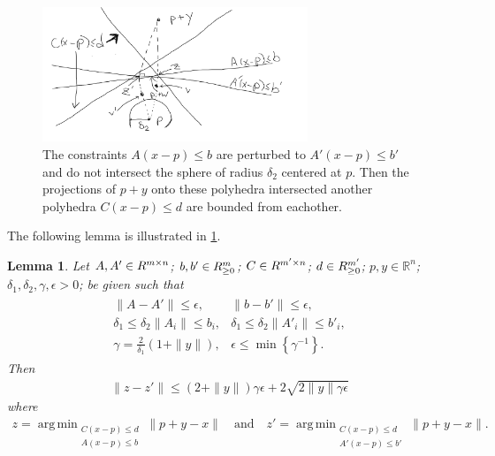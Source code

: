 \documentclass{article}
\newtheorem{lemma}[theorem]{Lemma}
\theoremstyle{case}
\numberwithin{theorem}{subsection}
\DeclareMathOperator*{\argmin}{arg\,min}
\newcommand{\Rn}{\mathbb R^n}
\begin{document}
\color{red}
\begin{figure}[ht]
	\centering
	\includegraphics[width=300px]{images/second_lemma.png}
	\caption{
		The constraints $A(x-p) \le b$ are perturbed to $A'(x-p) \le b'$ and do not intersect the sphere of radius $\delta_2$ centered at $p$.
		Then the projections of $p+y$ onto these polyhedra intersected another polyhedra $C(x-p) \le d$ are bounded from eachother.
	}
	\label{second_lemma}
\end{figure}
The following lemma is illustrated in \cref{second_lemma}.


\begin{lemma}
\label{simplified_projections_lemma}
Let
$A, A' \in \mathbb \mathbb R^{m \times n}$;
$b, b' \in \mathbb \mathbb R^{m}_{\ge 0}$;
$C \in \mathbb \mathbb R^{m' \times n}$;
$d \in \mathbb \mathbb R^{m'}_{\ge 0}$;
$p, y \in \Rn$;
$\delta_1, \delta_2, \gamma, \epsilon > 0$;
be given such that
\begin{align*}
\begin{array}{cccccc}
\|A - A'\| \le \epsilon, &
\|b - b'\| \le \epsilon, \\
\delta_1 \le \delta_2 \|A_i\| \le b_i, &
\delta_1 \le \delta_2 \|A'_i\| \le b'_i, \\
\gamma = \frac{2}{\delta_1}\left(1 + \|y\|\right), &
\epsilon \le \min\left\{\gamma^{-1}\right\}.
\end{array}
\end{align*}
Then
\begin{align*}
\|z - z'\| \le \left(2 + \|y\|\right) \gamma \epsilon + 2 \sqrt{2\|y\|\gamma \epsilon}
\end{align*}
where
\begin{align*}
z  = \argmin_{\substack{C(x - p) \le d \\ A (x - p) \le b }} \|p + y - x\| \quad \textrm{and} \quad
z' = \argmin_{\substack{C(x - p) \le d \\ A'(x - p) \le b'}} \|p + y - x\|.
\end{align*}
\end{lemma}
\end{document}
